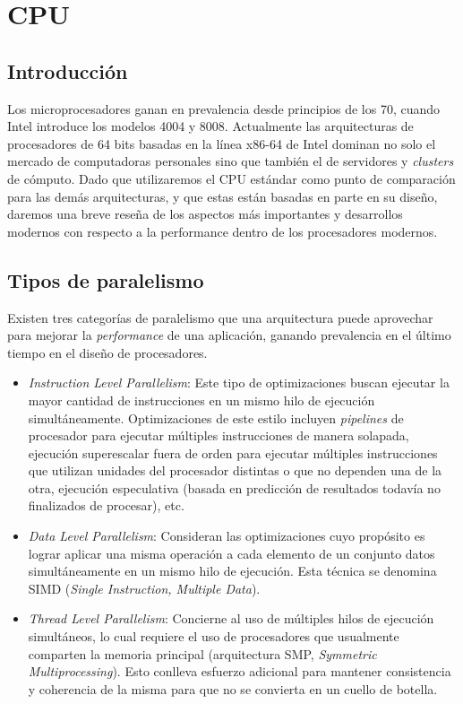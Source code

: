 \section {CPU}

\subsection{Introducci\'on}

Los microprocesadores ganan en prevalencia desde principios de los 70,
cuando Intel introduce los modelos 4004 y 8008. Actualmente las arquitecturas
de procesadores de 64 bits basadas en la l\'inea x86-64 de Intel
dominan no solo el mercado de computadoras personales sino que tambi\'en el de
servidores y \textit{clusters} de c\'omputo. Dado que utilizaremos el CPU
est\'andar como punto de comparaci\'on para las dem\'as arquitecturas, y que estas
est\'an basadas en parte en su dise\~no, daremos una breve rese\~na de los aspectos
m\'as importantes y desarrollos modernos con respecto a la performance dentro de
los procesadores modernos.

\subsection{Tipos de paralelismo}

Existen tres categor\'ias de paralelismo que una arquitectura puede aprovechar
para mejorar la \textit{performance} de una aplicaci\'on, ganando prevalencia
en el \'ultimo tiempo en el dise\~no de procesadores.

\begin{itemize}
    \item \textit{Instruction Level Parallelism}: Este tipo de optimizaciones buscan
    ejecutar la mayor cantidad de instrucciones en un mismo hilo de ejecuci\'on simult\'aneamente.
    Optimizaciones de este estilo incluyen
    \textit{pipelines} de procesador para ejecutar m\'ultiples instrucciones de manera solapada,
    ejecuci\'on superescalar fuera de orden para ejecutar m\'ultiples instrucciones que
    utilizan unidades del procesador distintas o que no dependen una de la otra, ejecuci\'on
    especulativa (basada en predicci\'on de resultados todav\'ia no finalizados de procesar), etc.

    \item \textit{Data Level Parallelism}: Consideran las optimizaciones cuyo prop\'osito es
    lograr aplicar una misma operaci\'on a cada elemento de un conjunto datos simult\'aneamente
    en un mismo hilo de ejecuci\'on. Esta t\'ecnica se denomina SIMD
    (\textit{Single Instruction, Multiple Data}).

    \item \textit{Thread Level Parallelism}: Concierne al uso de m\'ultiples hilos de ejecuci\'on
    simult\'aneos, lo cual requiere el uso de procesadores que usualmente
    comparten la memoria principal (arquitectura SMP, \textit{Symmetric Multiprocessing}).
    Esto conlleva esfuerzo adicional para mantener consistencia y coherencia de la misma
    para que no se convierta en un cuello de botella.
\end{itemize}

